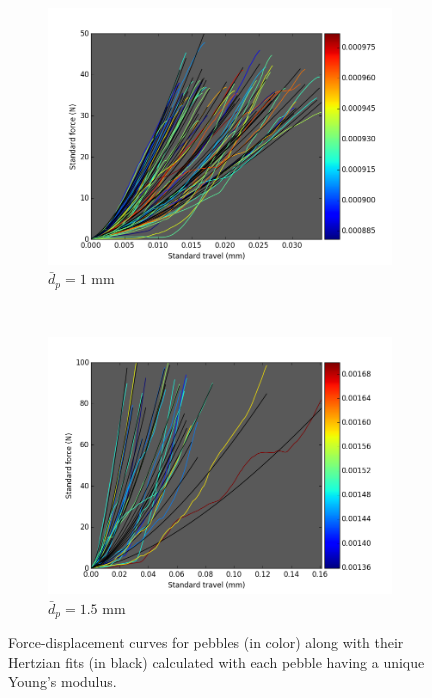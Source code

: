 \begin{figure}
        \centering
        \begin{subfigure}[b]{\doubleimagewidth}
                \includegraphics[width=\textwidth]{chapters/figures/nfri-1mm-hertz-colormap.png}
                \caption{$\bar{d}_p = 1$ mm}
                \label{fig:nfri-1-exp-hertz}
        \end{subfigure}
        ~
        \begin{subfigure}[b]{\doubleimagewidth}
                \includegraphics[width=\textwidth]{chapters/figures/nfri-1.5mm-hertz-colormap.png}
                \caption{$\bar{d}_p = 1.5$ mm}
                \label{fig:nfri-1.5-exp-hertz}
        \end{subfigure}
        \caption{Force-displacement curves for \lit pebbles (in color) along with their Hertzian fits (in black) calculated with each pebble having a unique Young's modulus.}\label{fig:nfri-exp-hertz}
\end{figure}

